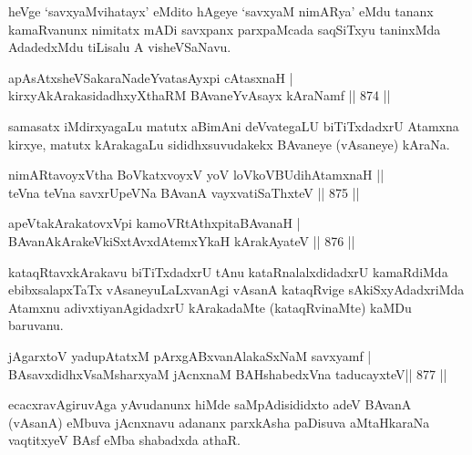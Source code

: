 \begin{artha}
heVge `savxyaMvihatayx' eMdito hAgeye `savxyaM nimARya' eMdu tananx kamaRvanunx nimitatx mADi savxpanx parxpaMcada saqSiTxyu taninxMda AdadedxMdu tiLisalu A visheVSaNavu.
\end{artha}


\begin{shl}
apAsAtxsheVSakaraNadeYvatasAyxpi cA\s \s tasxnaH | \\
kirxyAkArakasidadhxyXthaRM BAvaneYvAsayx kAraNamf \hfill||  874 ||  
\end{shl}

\begin{artha}
samasatx iMdirxyagaLu matutx aBimAni deVvategaLU biTiTxdadxrU Atamxna kirxye, matutx kArakagaLu sididhxsuvudakekx BAvaneye (vAsaneye) kAraNa.
\end{artha}


\begin{shl}
nimARtavoyxV\s tha BoVkatxvoyxV yoV loVkoV\s BUdihA\s \s tamxnaH ||  \\
teVna teVna savxrUpeVNa BAvanA vayxvatiSaThxteV \hfill||  875 ||  
\end{shl}


\begin{shl}
apeVtakArakatovxV\s pi kamoVRtAthxpitaBAvanaH | \\
BAvanAkArakeVkiSxtAvxdAtemxYkaH kArakAyateV \hfill||  876 || 
\end{shl}

\begin{artha}
kataqRtavxkArakavu biTiTxdadxrU tAnu kataRnalalxdidadxrU kamaRdiMda ebibxsalapxTaTx vAsaneyuLaLxvanAgi vAsanA kataqRvige sAkiSxyAdadxriMda Atamxnu adivxtiyanAgidadxrU kArakadaMte (kataqRvinaMte) kaMDu baruvanu.
\end{artha}


\begin{shl}
jAgarxtoV yadupAtatxM pArxgABxvanAlakaSxNaM savxyamf | \\
BAsavxdidhxVsaMsharxyaM jAcnxnaM BAHshabedxVna taducayxteV\hfill ||  877 ||  
\end{shl}

\begin{artha}
ecacxravAgiruvAga yAvudanunx hiMde saMpAdisididxto adeV BAvanA (vAsanA) eMbuva jAcnxnavu adananx parxkAsha paDisuva aMtaHkaraNa vaqtitxyeV BAsf eMba shabadxda athaR.
\end{artha}
